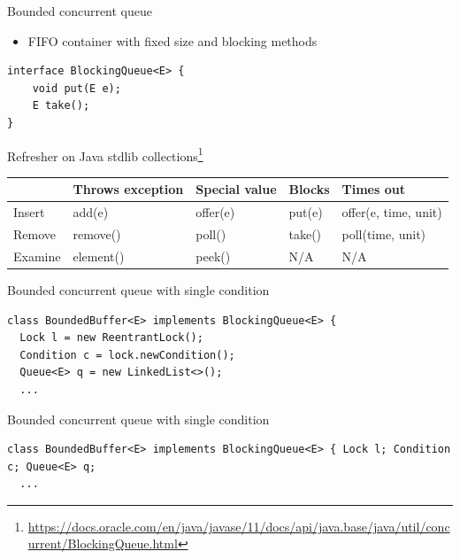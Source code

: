 \begin{frame}{Bounded concurrent queue}

\begin{itemize}
    \item FIFO container with fixed size and blocking methods
\end{itemize}

\begin{verbatim}
interface BlockingQueue<E> {
    void put(E e);
    E take();
}
\end{verbatim}
\pause

\begin{center} Refresher on Java stdlib collections\footnote<2->{\tiny\url{https://docs.oracle.com/en/java/javase/11/docs/api/java.base/java/util/concurrent/BlockingQueue.html}} \end{center}
\newline

\begin{tabular}{l|llll}
         &    Throws exception  &  Special value &  Blocks  & Times out            \\
\hline
Insert   &    add(e)            &  offer(e)      &  put(e)  & offer(e, time, unit) \\
Remove   &    remove()          &  poll()        &  take()  & poll(time, unit)     \\
Examine  &    element()         &  peek()        &  N/A     & N/A                  \\
\end{tabular}

\end{frame}

\begin{frame}[t,fragile]{Bounded concurrent queue with single condition}

\begin{verbatim}
class BoundedBuffer<E> implements BlockingQueue<E> {
  Lock l = new ReentrantLock(); 
  Condition c = lock.newCondition();
  Queue<E> q = new LinkedList<>();
  ...
\end{verbatim}

\end{frame}

\begin{frame}{Bounded concurrent queue with single condition}

\begin{verbatim}
class BoundedBuffer<E> implements BlockingQueue<E> { Lock l; Condition c; Queue<E> q;
  ...
\end{verbatim}

\end{frame}

